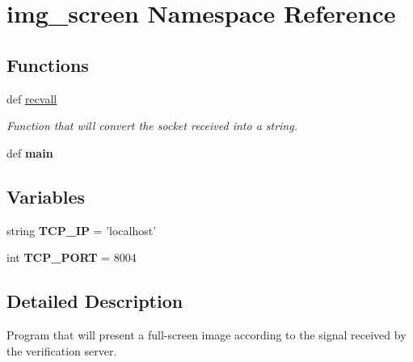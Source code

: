 \hypertarget{namespaceimg__screen}{\section{img\-\_\-screen Namespace Reference}
\label{namespaceimg__screen}
}
\subsection*{Functions}
\begin{DoxyCompactItemize}
\item 
def \hyperlink{namespaceimg__screen_ac496bc3e84cfd586ffb8f03ba3582a3e}{recvall}
\begin{DoxyCompactList}\small\item\em Function that will convert the socket received into a string. \end{DoxyCompactList}\item 
\hypertarget{namespaceimg__screen_a0790b1df73a7812a2685826e338171f6}{def {\bfseries main}}\label{namespaceimg__screen_a0790b1df73a7812a2685826e338171f6}

\end{DoxyCompactItemize}
\subsection*{Variables}
\begin{DoxyCompactItemize}
\item 
\hypertarget{namespaceimg__screen_a4ff0562588b8f821d56dc8c337a8002f}{string {\bfseries T\-C\-P\-\_\-\-I\-P} = 'localhost'}\label{namespaceimg__screen_a4ff0562588b8f821d56dc8c337a8002f}

\item 
\hypertarget{namespaceimg__screen_abb1cc73fc386a79c181d62ea05038068}{int {\bfseries T\-C\-P\-\_\-\-P\-O\-R\-T} = 8004}\label{namespaceimg__screen_abb1cc73fc386a79c181d62ea05038068}

\end{DoxyCompactItemize}


\subsection{Detailed Description}
\begin{DoxyVerb}Program that will present a full-screen image according to the signal received by the verification server.
\end{DoxyVerb}
 

